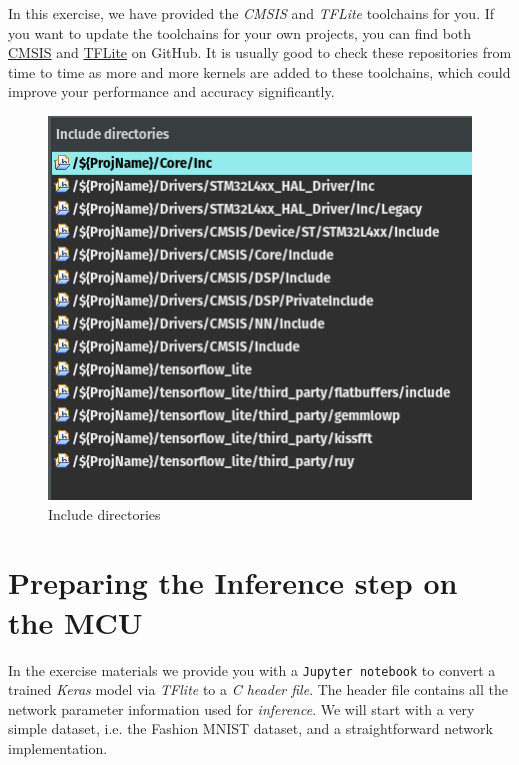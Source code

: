 \documentclass[parskip=half,notes,cadrem,toolver]{iisvlsi}
\begin{document}
\begin{note*}
In this exercise, we have provided the \textit{CMSIS} and \textit{TFLite} toolchains for you. If you want to update the toolchains for your own projects, you can find both \href{https://github.com/ARM-software/CMSIS_5}{CMSIS} and \href{https://github.com/tensorflow/tflite-micro}{TFLite} on GitHub. It is usually good to check these repositories from time to time as more and more kernels are added to these toolchains, which could improve your performance and accuracy significantly. 
\end{note*}

\begin{figure}[H]
    \centering
    \includegraphics[width=0.5\linewidth]{figures/include_directories.png}
    \caption{Include directories}
    \label{fig:enter-label}
\end{figure}


\section{Preparing the Inference step on the MCU}

In the exercise materials we provide you with a \texttt{Jupyter notebook} to convert a trained \textit{Keras} model via \textit{TFlite} to a \textit{C header file}. The header file contains all the network parameter information used for \textit{inference}. We will start with a very simple dataset, i.e. the Fashion MNIST dataset, and a straightforward network implementation.
\end{document}
